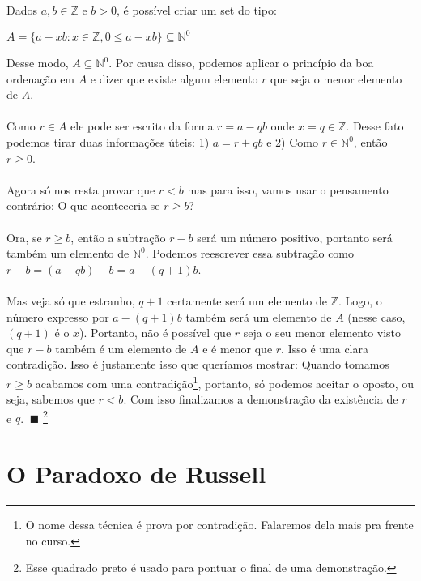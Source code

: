 \documentclass[main.tex]{subfiles}
\begin{document}
\begin{demonstration}
Dados $a,b \in \mathbb{Z}$ e $b > 0$, é possível criar um set do tipo:
\begin{center}
	$ A = \{ a - xb : x \in \mathbb{Z}, 0 \leq a - xb \} \subseteq \mathbb{N}^0 $
\end{center}
Desse modo, $A \subseteq \mathbb{N}^0$. Por causa disso, podemos aplicar o princípio da boa ordenação em $A$ e dizer que existe algum elemento $r$ que seja o menor elemento de $A$.
\\~\\
Como $r \in A$ ele pode ser escrito da forma $r = a - qb$ onde $x = q \in \mathbb{Z}$. Desse fato podemos tirar duas informações úteis: 1) $a = r + qb$ e 2) Como $r \in \mathbb{N}^0$, então $r \geq 0$.
\\~\\
Agora só nos resta provar que $r < b$ mas para isso, vamos usar o pensamento contrário: O que aconteceria se $r \geq b$?
\\~\\
Ora, se $r \geq b$, então a subtração $r - b$ será um número positivo, portanto será também um elemento de $\mathbb{N}^0$. Podemos reescrever essa subtração como $r - b = (a - qb) - b = a - (q + 1)b$. 
\\~\\
Mas veja só que estranho, $q + 1$ certamente será um elemento de $\mathbb{Z}$. Logo, o número expresso por $a - (q + 1)b$ também será um elemento de $A$ (nesse caso, $(q + 1)$ é o $x$). Portanto, não é possível que $r$ seja o seu menor elemento visto que $r - b$ também é um elemento de $A$ e é menor que $r$. Isso é uma clara contradição. Isso é justamente isso que queríamos mostrar: Quando tomamos $r \geq b$ acabamos com uma contradição\footnote{O nome dessa técnica é prova por contradição. Falaremos dela mais pra frente no curso.}, portanto, só podemos aceitar o oposto, ou seja, sabemos que $r < b$. Com isso finalizamos a demonstração da existência de $r$ e $q$. $\ \blacksquare$ \footnote{Esse quadrado preto é usado para pontuar o final de uma demonstração.}
\end{demonstration}


\section{O Paradoxo de Russell}
\end{document}
